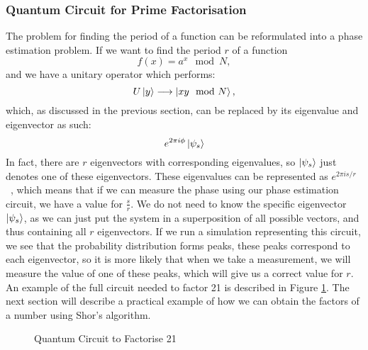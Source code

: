 \subsubsection{Quantum Circuit for Prime Factorisation}
The problem for finding the period of a function can be reformulated into a phase estimation problem. If we want to find the period $r$ of a function $$f(x) = a^x\mod N,$$ and we have a unitary operator which performs: $$U\ket{y} \longrightarrow \ket{xy\mod N},$$ which, as discussed in the previous section, can be replaced by its eigenvalue and eigenvector as such: $$e^{2\pi i\phi}\ket{\psi_s}$$ In fact, there are $r$ eigenvectors with corresponding eigenvalues, so $\ket{\psi_s}$ just denotes one of these eigenvectors. These eigenvalues can be represented as $e^{2\pi is/r}$~\cite{nielsen2002quantum}, which means that if we can measure the phase using our phase estimation circuit, we have a value for $\frac{s}{r}$. We do not need to know the specific eigenvector $\ket{\psi_s}$, as we can just put the system in a superposition of all possible vectors, and thus containing all $r$ eigenvectors. If we run a simulation representing this circuit, we see that the probability distribution forms peaks, these peaks correspond to each eigenvector, so it is more likely that when we take a measurement, we will measure the value of one of these peaks, which will give us a correct value for $r$. An example of the full circuit needed to factor 21 is described in Figure \ref{fig:shors21}. The next section will describe a practical example of how we can obtain the factors of a number using Shor's algorithm.
\begin{figure}[!htb]
\centering
\resizebox{10cm}{!}{}
\caption{Quantum Circuit to Factorise 21}
\label{fig:shors21}
\end{figure}
